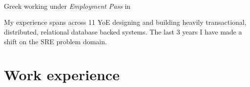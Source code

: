 \documentclass{CVSoftwareEngineer}
\begin{document}
	\section{\textbf{\cvname}}
	\begin{center}
		\href{mailto:\cvmail}{\cvmail} \space \textbar \space \cvlinkedin \space \textbar \space \cvgithub \\
		Greek working under \textit{Employment Pass} in \cvaddress
	\end{center}
	My experience spans across 11 YoE designing and building heavily transactional, distributed,
	relational database backed systems. The last 3 years I have made a shift on the SRE problem domain.

	\section{Work experience}
\end{document}
